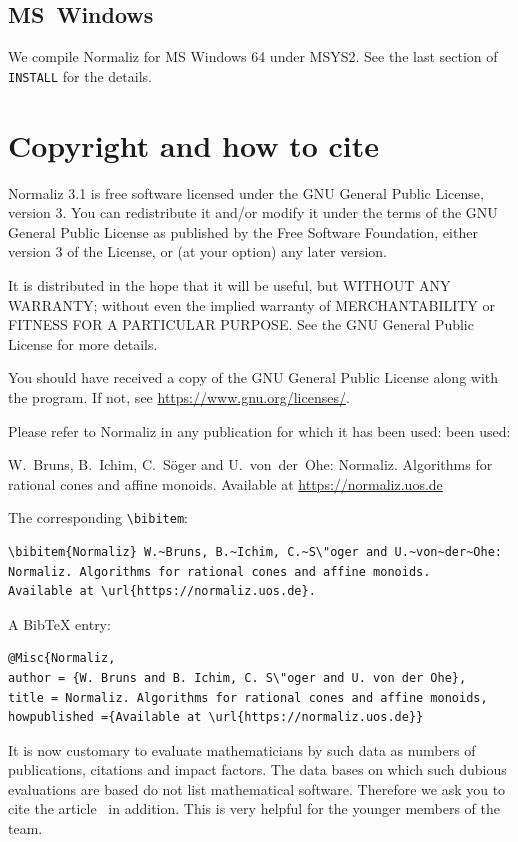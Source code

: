 \subsection{MS~Windows}

We compile Normaliz for MS Windows 64 under MSYS2. See the last section of \verb|INSTALL| for the details.

\section{Copyright and how to cite}

Normaliz 3.1 is free software licensed under the GNU General
Public License, version 3. You can redistribute it and/or
modify it under the terms of the GNU General Public License as
published by the Free Software Foundation, either version 3 of
the License, or (at your option) any later version.

It is distributed in the hope that it will be useful, but
WITHOUT ANY WARRANTY; without even the implied warranty of
MERCHANTABILITY or FITNESS FOR A PARTICULAR PURPOSE. See the
GNU General Public License for more details.

You should have received a copy of the GNU General Public
License along with the program. If not, see
\url{https://www.gnu.org/licenses/}.

Please refer to Normaliz in any publication for which it has
been used:
been used:
\begin{center}
	W.~Bruns, B.~Ichim, C.~S\"oger and U.~von~der~Ohe: Normaliz. Algorithms for
	rational cones and affine monoids. Available at
	\url{https://normaliz.uos.de}
\end{center}
The corresponding \verb|\bibitem|:
\begin{Verbatim}
\bibitem{Normaliz} W.~Bruns, B.~Ichim, C.~S\"oger and U.~von~der~Ohe:
Normaliz. Algorithms for rational cones and affine monoids.
Available at \url{https://normaliz.uos.de}.
\end{Verbatim}

A BibTeX entry:
\begin{Verbatim}
@Misc{Normaliz,
author = {W. Bruns and B. Ichim, C. S\"oger and U. von der Ohe},
title = Normaliz. Algorithms for rational cones and affine monoids,
howpublished ={Available at \url{https://normaliz.uos.de}}
\end{Verbatim}

It is now customary to evaluate mathematicians by such data as
numbers of publications, citations and impact factors. The data
bases on which such dubious evaluations are based do not list
mathematical software. Therefore we ask you to cite the article~\cite{BIS}
in addition. This is very helpful for the younger
members of the team.
